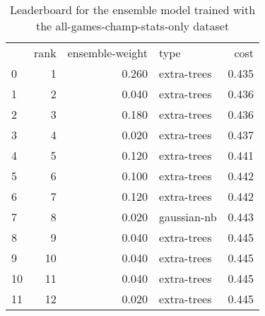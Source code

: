 \begin{table}[]
	\centering
	\begin{tabular}{lrrlr}
		   & rank & ensemble-weight & type        & cost  \\
		0  & 1    & 0.260           & extra-trees & 0.435 \\
		1  & 2    & 0.040           & extra-trees & 0.436 \\
		2  & 3    & 0.180           & extra-trees & 0.436 \\
		3  & 4    & 0.020           & extra-trees & 0.437 \\
		4  & 5    & 0.120           & extra-trees & 0.441 \\
		5  & 6    & 0.100           & extra-trees & 0.442 \\
		6  & 7    & 0.120           & extra-trees & 0.442 \\
		7  & 8    & 0.020           & gaussian-nb & 0.443 \\
		8  & 9    & 0.040           & extra-trees & 0.445 \\
		9  & 10   & 0.040           & extra-trees & 0.445 \\
		10 & 11   & 0.040           & extra-trees & 0.445 \\
		11 & 12   & 0.020           & extra-trees & 0.445 \\
	\end{tabular}

	\caption{Leaderboard for the ensemble model trained with the all-games-champ-stats-only dataset}
	\label{tab:lb-all-games-champ-stats-only-randsplit}
\end{table}

